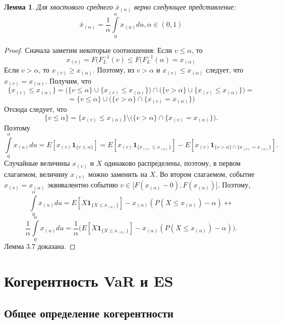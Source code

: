 \documentclass[14pt,a4paper]{article}
\theoremstyle{plain}
\newtheorem{Lemma}{Лемма}[section]
\theoremstyle{definition}
\begin{document}
\begin{Lemma}
Для хвостового среднего $\bar{x}_{(\alpha)} $ верно следующее представление:
\begin{equation}
\bar{x}_{(\alpha)} = \frac{1}{\alpha} \int\limits^\alpha_0 x_{(u)}du, \alpha \in (0,1)
\end{equation}
\end{Lemma}
\begin{proof}
Сначала заметим некоторые соотношения:
Если $v \le \alpha$, то $$x_{(v)} =  F(F^{-1}_L (v) \le  F(F^{-1}_L (\alpha) = x_{(\alpha)}        $$
Если $v > \alpha$, то $x_{(v)} \ge x_{(\alpha)}$. Поэтому, из $v>\alpha$ и $x_{(v)} \le x_{(\alpha)}$ следует, что $x_{(v)} = x_{(\alpha)} $.
Получим, что
$$
\{x_{(v)} \le x_{(\alpha)} \} = \Big( \{v \le \alpha\} \cup  \{ x_{(v)} \le x_{(\alpha)} \} \Big) \cap \Big( \{v>\alpha\} \cup  \{ x_{(v)} \le x_{(\alpha)}  \} \Big) =
$$
$$
= \{v \le \alpha\} \cup \big( \{v>\alpha\} \cap  \{ x_{(v)} = x_{(\alpha)}  \} \big)
$$
Отсюда следует, что
$$
\{v \le \alpha\} = \{ x_{(v)} \le x_{(\alpha)}  \} \setminus  \big( \{v>\alpha\} \cap  \{ x_{(v)} = x_{(\alpha)}  \} \big).
$$
Поэтому
$$
\int\limits^\alpha_0 x_{(u)}du = E[x_{(v)}\mathbf{1}_{\{ v \le \alpha \}}] = E[x_{(v)}\mathbf{1}_{\{ x_{(v)}  \le x_{(\alpha)}  \}}] - E[x_{(v)}\mathbf{1}_{\{v>\alpha\} \cap  \{x_{(v)}=x_{(\alpha)}\}}].
$$
Случайные величины $x_{(v)}$ и $X$ одинаково распределены, поэтому, в первом слагаемом, величину $x_{(v)}$ можно заменить на $X$. Во втором слагаемом, событие $x_{(v)} = x_{(\alpha)}$ эквивалентно
событию $v \in \Big[F(x_{(\alpha)}-0),F(x_{(\alpha)})\Big]$.
Поэтому,
$$
\int\limits^\alpha_0 x_{(u)}du = E[X \mathbf{1}_{\{X \le x_{(\alpha)} \}}] - x_{(\alpha)}(P(X \le x_{(\alpha)}) - \alpha) \leftrightarrow
$$
$$
\frac{1}{\alpha} \int\limits^\alpha_0 x_{(u)}du = \frac{1}{\alpha} \Big( E[X \mathbf{1}_{\{X \le x_{(\alpha)} \}}] - x_{(\alpha)}(P(X \le x_{(\alpha)}) - \alpha) \Big).
$$
Лемма 3.7 доказана.
\end{proof}

 \section{Когерентность VaR и ES}

 \subsection{Общее определение когерентности}
\end{document}
